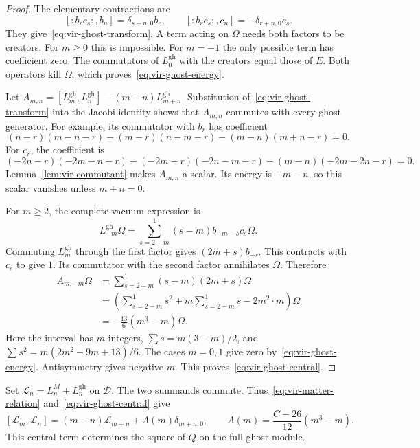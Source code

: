 \begin{proof}
The elementary contractions are
\[
 [:b_rc_s:,b_n]=\delta_{s+n,0}b_r,
 \qquad
 [:b_rc_s:,c_n]=-\delta_{r+n,0}c_s.
\]
They give~\eqref{eq:vir-ghost-transform}.
A term acting on $\Omega$ needs both factors to be creators.
For $m\geq0$ this is impossible.
For $m=-1$ the only possible term has coefficient zero.
The commutators of $L_0^{\mathrm{gh}}$ with the creators equal those of $E$.
Both operators kill $\Omega$, which proves~\eqref{eq:vir-ghost-energy}.

Let
$A_{m,n}=[L_m^{\mathrm{gh}},L_n^{\mathrm{gh}}]-(m-n)L_{m+n}^{\mathrm{gh}}$.
Substitution of~\eqref{eq:vir-ghost-transform} into the Jacobi identity shows that $A_{m,n}$ commutes with every ghost generator.
For example, its commutator with $b_r$ has coefficient
\[
 (n-r)(m-n-r)-(m-r)(n-m-r)-(m-n)(m+n-r)=0.
\]
For $c_r$, the coefficient is
\[
 (-2n-r)(-2m-n-r)-(-2m-r)(-2n-m-r)
 -(m-n)(-2m-2n-r)=0.
\]
Lemma~\ref{lem:vir-commutant} makes $A_{m,n}$ a scalar.
Its energy is $-m-n$, so this scalar vanishes unless $m+n=0$.

For $m\geq2$, the complete vacuum expression is
\[
 L_{-m}^{\mathrm{gh}}\Omega
 =\sum_{s=2-m}^{1}(s-m)b_{-m-s}c_s\Omega.
\]
Commuting $L_m^{\mathrm{gh}}$ through the first factor gives $(2m+s)b_{-s}$.
This contracts with $c_s$ to give $1$.
Its commutator with the second factor annihilates $\Omega$.
Therefore
\begin{align*}
 A_{m,-m}\Omega
 &=\sum_{s=2-m}^{1}(s-m)(2m+s)\Omega\\
 &=\left(\sum_{s=2-m}^{1}s^2
      +m\sum_{s=2-m}^{1}s-2m^2\cdot m\right)\Omega\\
 &=-\frac{13}{6}(m^3-m)\Omega.
\end{align*}
Here the interval has $m$ integers,
$\sum s=m(3-m)/2$, and
$\sum s^2=m(2m^2-9m+13)/6$.
The cases $m=0,1$ give zero by~\eqref{eq:vir-ghost-energy}.
Antisymmetry gives negative $m$.
This proves~\eqref{eq:vir-ghost-central}.
\end{proof}

Set $\mathcal L_n=L_n^M+L_n^{\mathrm{gh}}$ on $\mathcal D$.
The two summands commute.
Thus~\eqref{eq:vir-matter-relation} and~\eqref{eq:vir-ghost-central} give
\begin{equation}\label{eq:vir-total-central}
 [\mathcal L_m,\mathcal L_n]
 =(m-n)\mathcal L_{m+n}+A(m)\delta_{m+n,0},
 \qquad A(m)=\frac{C-26}{12}(m^3-m).
\end{equation}
This central term determines the square of $Q$ on the full ghost module.

